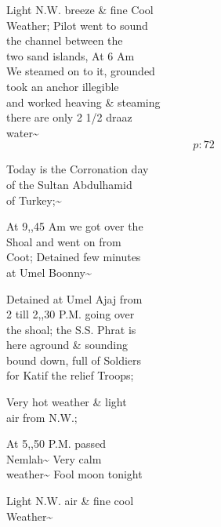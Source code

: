 \documentclass{report}
\begin{document}
	\par{
 	Light N.W. breeze \& fine Cool\ \\Weather; Pilot went to sound\ \\the channel between the\ \\two sand islands, At 6 Am\ \\We steamed on to it, grounded\ \\took an anchor \lbrack illegible\rbrack\ \\and worked heaving \& steaming\ \\there are only 2 1/2 draaz\ \\water\~{}\ \\
  \[p: 72 \]

	}

	\par{
 	Today is the Corronation day\ \\of the Sultan Abdulhamid\ \\of Turkey;\~{}\ \\
	}

	\par{
 	At 9,,45 Am we got over the\ \\Shoal and went on from\ \\Coot; Detained few minutes\ \\at Umel Boonny\~{}\ \\
	}

	\par{
 	Detained at Umel Ajaj from\ \\2 till 2,,30 P.M. going over\ \\the shoal; the S.S. Phrat is\ \\here aground \& sounding\ \\bound down, full of Soldiers\ \\for Katif the relief Troops;\ \\
	}

	\par{
 	Very hot weather \& light\ \\air from N.W.;\ \\
	}

	\par{
 	At 5,,50 P.M. passed\ \\Nemlah\~{} Very calm\ \\weather\~{} Fool moon tonight\ \\
	}

	\par{
 	Light N.W. air \& fine cool\ \\Weather\~{}\ \\
	}
\end{document}
